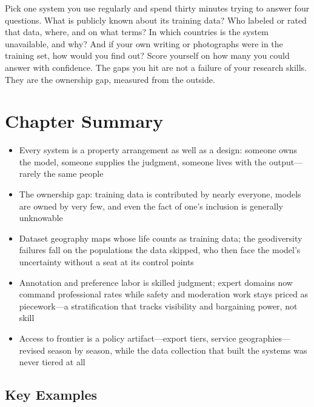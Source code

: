 \begin{trythis}
Pick one \ai system you use regularly and spend thirty minutes trying to answer four questions. What is publicly known about its training data? Who labeled or rated that data, where, and on what terms? In which countries is the system unavailable, and why? And if your own writing or photographs were in the training set, how would you find out? Score yourself on how many you could answer with confidence. The gaps you hit are not a failure of your research skills. They are the ownership gap, measured from the outside.
\end{trythis}

\section*{Chapter Summary}

\begin{keyconcept}
\begin{itemize}
  \item Every \hitl system is a property arrangement as well as a design: someone owns the model, someone supplies the judgment, someone lives with the output---rarely the same people
  \item The ownership gap: training data is contributed by nearly everyone, models are owned by very few, and even the fact of one's inclusion is generally unknowable
  \item Dataset geography maps whose life counts as training data; the geodiversity failures fall on the populations the data skipped, who then face the model's uncertainty without a seat at its control points
  \item Annotation and preference labor is skilled judgment; expert domains now command professional rates while safety and moderation work stays priced as piecework---a stratification that tracks visibility and bargaining power, not skill
  \item Access to frontier \ai is a policy artifact---export tiers, service geographies---revised season by season, while the data collection that built the systems was never tiered at all
\end{itemize}
\end{keyconcept}

\subsection*{Key Examples}

